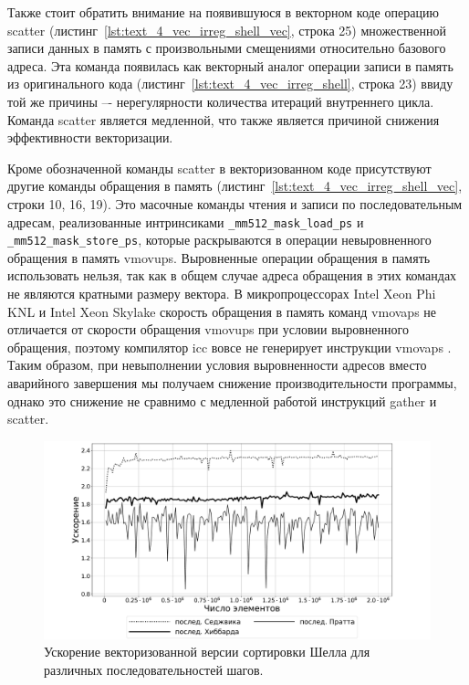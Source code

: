 Также стоит обратить внимание на появившуюся в векторном коде операцию scatter (листинг~\ref{lst:text_4_vec_irreg_shell_vec}, строка 25) множественной записи данных в память с произвольными смещениями относительно базового адреса.
Эта команда появилась как векторный аналог операции записи в память из оригинального кода (листинг~\ref{lst:text_4_vec_irreg_shell}, строка 23) ввиду той же причины –- нерегулярности количества итераций внутреннего цикла.
Команда scatter является медленной, что также является причиной снижения эффективности векторизации.

Кроме обозначенной команды scatter в векторизованном коде присутствуют другие команды обращения в память (листинг~\ref{lst:text_4_vec_irreg_shell_vec}, строки 10, 16, 19).
Это масочные команды чтения и записи по последовательным адресам, реализованные интринсиками \texttt{\_mm512\_mask\_load\_ps} и \texttt{\_mm512\_mask\_store\_ps}, которые раскрываются в операции невыровненного обращения в память vmovups.
Выровненные операции обращения в память использовать нельзя, так как в общем случае адреса обращения в этих командах не являются кратными размеру вектора.
В микропроцессорах Intel Xeon Phi KNL и Intel Xeon Skylake скорость обращения в память команд vmovaps не отличается от скорости обращения vmovups при условии выровненного обращения, поэтому компилятор icc вовсе не генерирует инструкции vmovaps \cite{MOVUPSintel}.
Таким образом, при невыполнении условия выровненности адресов вместо аварийного завершения мы получаем снижение производительности программы, однако это снижение не сравнимо с медленной работой инструкций gather и scatter.

\begin{figure}[ht]
\centering
\includegraphics[width=1.0\textwidth]{fig/vec_shell_experimental_eff.pdf}
\singlespacing
{}\caption{Ускорение векторизованной версии сортировки Шелла для различных последовательностей шагов.}
\label{fig:text_4_vec_irreg_eff}
\end{figure}

